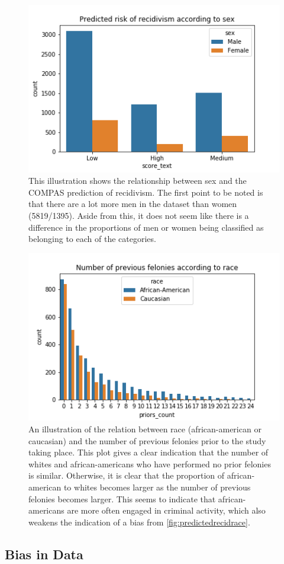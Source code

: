 \documentclass[11pt, fleqn, titlepage]{article}
\begin{document}
	\begin{figure}[H]
		\centering
		\includegraphics[width=0.5\linewidth]{imgs/predicted_recid_sex}
		\caption{This illustration shows the relationship between sex and the COMPAS prediction of recidivism. The first point to be noted is that there are a lot more men in the dataset than women (5819/1395). Aside from this, it does not seem like there is a difference in the proportions of men or women being classified as belonging to each of the categories.}
		\label{fig:predictedrecidsex}
	\end{figure}
	
	\begin{figure}[H]
		\centering
		\includegraphics[width=0.5\linewidth]{imgs/proirs}
		\caption{An illustration of the relation between race (african-american or caucasian) and the number of previous felonies prior to the study taking place. This plot gives a clear indication that the number of whites and african-americans who have performed no prior felonies is similar. Otherwise, it is clear that the proportion of african-american to whites becomes larger as the number of previous felonies becomes larger. This seems to indicate that african-americans are more often engaged in criminal activity, which also weakens the indication of a bias from \ref{fig:predictedrecidrace}.}
		\label{fig:proirs}
	\end{figure}
	
	
	
	\subsection{Bias in Data}
	
\end{document}
